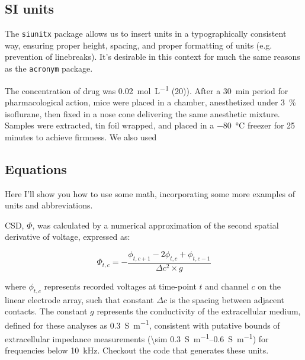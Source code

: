 \documentclass[../../main.tex]{subfiles}  %
\begin{document}
	\subsection{SI units}

	The \verb|siunitx| package allows us to insert units in a typographically consistent way, ensuring proper height, spacing, and proper formatting of units (e.g. prevention of linebreaks).
	It's desirable in this context for much the same reasons as the \verb|acronym| package.


	The concentration of drug was \SI[per-mode=fraction]{0.02}{\mol\per\L} (\SI{20}{\mM})).
	After a \SI{30}{\minute} period for pharmacological action, mice were placed in a chamber, anesthetized under \qty{3}{\percent} isoflurane, then fixed in a nose cone delivering the same anesthetic mixture. 
	Samples were extracted, tin foil wrapped, and placed in a \SI{-80}{\degreeCelsius} freezer for 25 minutes to achieve firmness. We also used 

	\subsection{Equations}

	Here I'll show you how to use some math, incorporating some more examples of units and abbreviations.

	\Acf{CSD}, $\Phi$, was calculated by a numerical approximation of the second spatial derivative of voltage, expressed as:

	\begin{equation}
		\Phi_{t, c} = -\frac{\phi_{t, c+1} - 2\phi_{t, c} + \phi_{t, c-1}}{\Delta c^2 \times g}
	\end{equation}

	where $\phi_{t, c}$ represents recorded voltages at time-point $t$ and channel $c$ on the linear electrode array, such that constant $\Delta c$ is the spacing between adjacent contacts. 
	The constant $g$ represents the conductivity of the extracellular medium, defined for these analyses as \SI[per-mode=fraction]{0.3}{\siemens\per\m}, consistent with putative bounds of extracellular impedance measurements (\qtyrange[range-units=single,range-phrase=-]{\sim 0.3}{0.6}{\siemens\per\m}) for frequencies below \SI{10}{\kHz}. 
	Checkout the code that generates these units. 
\end{document}
